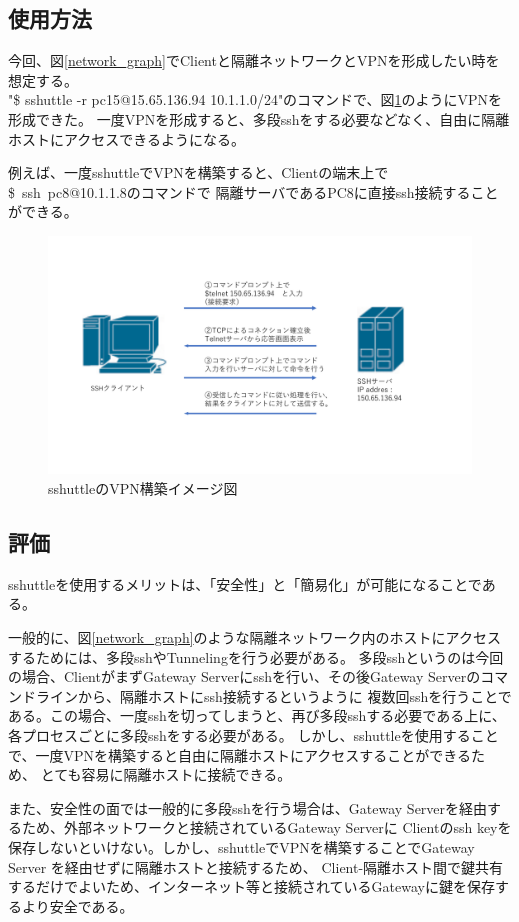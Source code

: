 \documentclass[11pt,a4j,titlepage]{jreport}
\begin{document}
\subsection*{使用方法}
今回、図\ref{network_graph}でClientと隔離ネットワークとVPNを形成したい時を想定する。\\
"\$ sshuttle -r pc15@15.65.136.94 10.1.1.0/24"のコマンドで、図\ref{sshuttleのVPN構築イメージ図}のようにVPNを形成できた。
一度VPNを形成すると、多段sshをする必要などなく、自由に隔離ホストにアクセスできるようになる。\par
例えば、一度sshuttleでVPNを構築すると、Clientの端末上で\\ \mbox{\$ ssh pc8@10.1.1.8}のコマンドで
隔離サーバであるPC8に直接ssh接続することができる。


\begin{figure}[h]
    \centering
    \includegraphics[width=1.0\textwidth, page=7]{graphs/network_archtecture.pdf}
    \caption{sshuttleのVPN構築イメージ図}
    \label{sshuttleのVPN構築イメージ図}
\end{figure}


\subsection*{評価}
sshuttleを使用するメリットは、「安全性」と「簡易化」が可能になることである。\par
一般的に、図\ref{network_graph}のような隔離ネットワーク内のホストにアクセスするためには、多段sshやTunnelingを行う必要がある。
多段sshというのは今回の場合、ClientがまずGateway Serverにsshを行い、その後Gateway Serverのコマンドラインから、隔離ホストにssh接続するというように
複数回sshを行うことである。この場合、一度sshを切ってしまうと、再び多段sshする必要である上に、各プロセスごとに多段sshをする必要がある。
しかし、sshuttleを使用することで、一度VPNを構築すると自由に隔離ホストにアクセスすることができるため、
とても容易に隔離ホストに接続できる。\par
また、安全性の面では一般的に多段sshを行う場合は、Gateway Serverを経由するため、外部ネットワークと接続されているGateway Serverに
Clientのssh keyを保存しないといけない。しかし、sshuttleでVPNを構築することでGateway Server を経由せずに隔離ホストと接続するため、
Client-隔離ホスト間で鍵共有するだけでよいため、インターネット等と接続されているGatewayに鍵を保存するより安全である。
\end{document}
